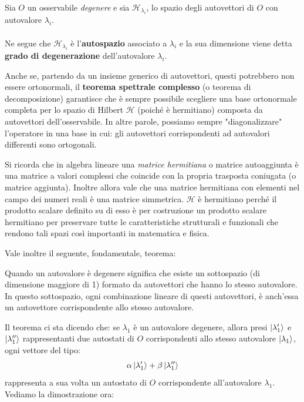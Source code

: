 \begin{mydef}
	Sia $O$ un osservabile \textit{degenere} e sia $\mathcal{H}_{\lambda_i}$, lo spazio degli autovettori di $O$ con autovalore $\lambda_i$.
	\\
	\\
	Ne segue che $\mathcal{H}_{\lambda_i}$ è l'\textbf{autospazio} associato a $\lambda_i$ e la sua dimensione viene detta \textbf{grado di degenerazione} dell'autovalore $\lambda_i$.
\end{mydef}

	Anche se, partendo da un insieme generico di autovettori, questi potrebbero non essere ortonormali, il \textbf{teorema spettrale complesso} (o teorema di decomposizione) garantisce che è sempre possibile scegliere una base ortonormale completa per lo spazio di Hilbert $\mathcal{H}$ (poiché è hermitiano) composta da autovettori dell'osservabile. In altre parole, possiamo sempre "diagonalizzare" l'operatore in una base in cui: gli autovettori corrispondenti ad autovalori differenti sono ortogonali.
	
\begin{myapprf}
	Si ricorda che in algebra lineare una \textit{matrice hermitiana} o matrice autoaggiunta è una matrice a valori complessi che coincide con la propria trasposta coniugata (o matrice aggiunta). Inoltre allora vale che una matrice hermitiana con elementi nel campo dei numeri reali è una matrice simmetrica. $\mathcal{H}$ è hermitiano perché il prodotto scalare definito su di esso è per costruzione un prodotto scalare hermitiano per preservare tutte le caratteristiche strutturali e funzionali che rendono tali spazi così importanti in matematica e fisica.
\end{myapprf}
	
	Vale inoltre il seguente, fondamentale, teorema:

\begin{myth}
	Quando un autovalore è degenere significa che esiste un sottospazio (di dimensione maggiore di 1) formato da autovettori che hanno lo stesso autovalore. In questo sottospazio, ogni combinazione lineare di questi autovettori, è anch'essa un autovettore corrispondente allo stesso autovalore.
\end{myth}

	Il teorema ci sta dicendo che: se $\lambda_1$ è un autovalore degenere, allora presi $\ket{\lambda_1'}$ e $\ket{\lambda_1''}$ rappresentanti due autostati di $O$ corrispondenti allo stesso autovalore $\ket{\lambda_1}$, ogni vettore del tipo:
\begin{align*}
	\alpha \ket{\lambda_1'} + \beta \ket{\lambda_1''}
\end{align*}
	rappresenta a sua volta un autostato di $O$ corrispondente all'autovalore $\lambda_1$. Vediamo la dimostrazione ora:

